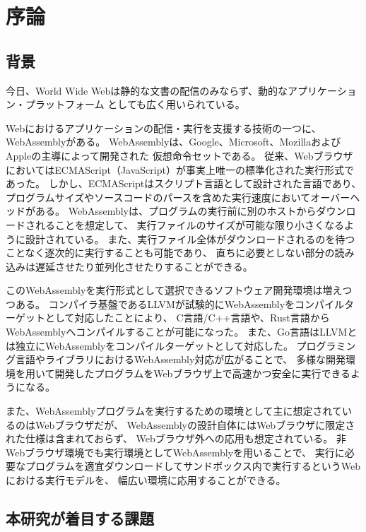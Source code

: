 \chapter{序論}
\label{chap:introduction}

\section{背景}
\label{section:background}

今日、World Wide Webは静的な文書の配信のみならず、動的なアプリケーション・プラットフォーム
としても広く用いられている。

Webにおけるアプリケーションの配信・実行を支援する技術の一つに、WebAssemblyがある。
WebAssemblyは、Google、Microsoft、MozillaおよびAppleの主導によって開発された
仮想命令セットである\cite{webassembly}。
従来、WebブラウザにおいてはECMAScript（JavaScript）が事実上唯一の標準化された実行形式であった。
しかし、ECMAScriptはスクリプト言語として設計された言語であり\cite{ecma2018}、
プログラムサイズやソースコードのパースを含めた実行速度においてオーバーヘッドがある。
WebAssemblyは、プログラムの実行前に別のホストからダウンロードされることを想定して、
実行ファイルのサイズが可能な限り小さくなるように設計されている。
また、実行ファイル全体がダウンロードされるのを待つことなく逐次的に実行することも可能であり、
直ちに必要としない部分の読み込みは遅延させたり並列化させたりすることができる。

このWebAssemblyを実行形式として選択できるソフトウェア開発環境は増えつつある。
コンパイラ基盤であるLLVMが試験的にWebAssemblyをコンパイルターゲットとして対応した\cite{}ことにより、
C言語/C++言語や、Rust言語\cite{rust_wasm}からWebAssemblyへコンパイルすることが可能になった。
また、Go言語はLLVMとは独立にWebAssemblyをコンパイルターゲットとして対応した\cite{go_wasm}。
プログラミング言語やライブラリにおけるWebAssembly対応が広がることで、
多様な開発環境を用いて開発したプログラムをWebブラウザ上で高速かつ安全に実行できるようになる。

また、WebAssemblyプログラムを実行するための環境として主に想定されているのはWebブラウザだが、
WebAssemblyの設計自体にはWebブラウザに限定された仕様は含まれておらず、
Webブラウザ外への応用も想定されている。
非Webブラウザ環境でも実行環境としてWebAssemblyを用いることで、
実行に必要なプログラムを適宜ダウンロードしてサンドボックス内で実行するというWebにおける実行モデルを、
幅広い環境に応用することができる。

\section{本研究が着目する課題}

